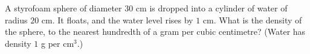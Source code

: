 A styrofoam sphere of diameter $30$ cm is dropped into a cylinder of water of radius $20$ cm. It floats, and the water level rises by $1$ cm. What is the density of the sphere, to the nearest hundredth of a gram per cubic centimetre? (Water has density $1$ g per cm$^3$.)
